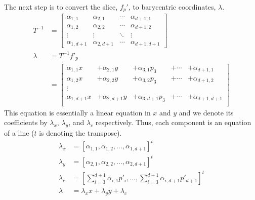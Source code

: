 The next step is to convert the slice, $f_p'$, to barycentric coordinates, 
$\lambda$.
\begin{align}
  T^{-1} &= 
    \begin{bmatrix}
      \alpha_{1,1} & \alpha_{2,1} & \cdots & \alpha_{d+1,1} \\
      \alpha_{1,2} & \alpha_{2,2} & \cdots & \alpha_{d+1,2} \\
      \vdots  & \vdots  & \ddots & \vdots    \\
      \alpha_{1,d+1} & \alpha_{2,d+1} & \cdots & \alpha_{d+1,d+1}
    \end{bmatrix} \\
  \lambda &= T^{-1} f'_p \\
          &= 
    \begin{bmatrix}
      \alpha_{1,1} x &+ \alpha_{2,1} y &+ \alpha_{3,1} p_3 &+ \cdots &+ \alpha_{d+1,1} \\
      \alpha_{1,2} x &+ \alpha_{2,2} y &+ \alpha_{3,2} p_3 &+ \cdots &+ \alpha_{d+1,2} \\
      \vdots \\
      \alpha_{1,d+1} x &+ \alpha_{2,d+1} y &+ \alpha_{3,d+1} p_3 &+ \cdots &+ \alpha_{d+1,d+1} \\
    \end{bmatrix}
    \label{eq:inverted}
\end{align}
This equation is essentially a linear equation in $x$ and $y$ and we denote its coefficients by $\lambda_x$, $\lambda_y$, and $\lambda_c$ respectively.
Thus, each component is an equation of a line ($t$ is denoting the transpose).
\begin{align}
  \lambda_x &= \left[ \alpha_{1,1}, \alpha_{1,2}, \ldots, \alpha_{1,d+1} \right]^t \\
  \lambda_y &= \left[ \alpha_{2,1}, \alpha_{2,2}, \ldots, \alpha_{2,d+1} \right]^t \\
  \lambda_c &= \left[ \sum_{i=3}^{d+1} \alpha_{i,1} p'_i, \ldots, \sum_{i=3}^{d+1} \alpha_{i,d+1} p'_{d+1} \right]^t \\
  \lambda &= \lambda_x x + \lambda_y y + \lambda_c
\end{align}

